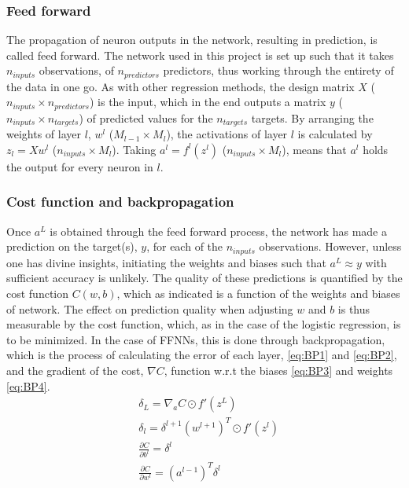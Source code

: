 \documentclass[%
oneside,                 %
final,                   %
10pt]{article}
\begin{document}
\subsubsection{Feed forward}
The propagation of neuron outputs in the network, resulting in prediction, is called feed forward. The network used in this project is set up such that it takes  $n_{inputs}$ observations, of $n_{predictors}$ predictors, thus working through the entirety of the data in one go. As with other regression methods, the design matrix $X$ ($n_{inputs} \times n_{predictors}$) is the input, which in the end outputs a matrix $ y$ ($n_{inputs} \times n_{targets}$) of predicted values for the $n_{targets}$ targets. By arranging the weights of layer $l$, $w^l$ ($M_{l-1} \times M_l$), the activations of layer $l$ is calculated by $z_l=X w^l$ ($n_{inputs} \times M_l$). Taking $a^l=f^l(z^l)$ ($n_{inputs} \times M_l$), means that $a^l$ holds the output for every neuron in $l$. 

\subsubsection{Cost function and backpropagation} \label{Section_M_NN}
Once $a^L$ is obtained through the feed forward process, the network has made a prediction on the target(s), $y$, for each of the $n_{inputs}$ observations. However, unless one has divine insights, initiating the weights and biases such that $a^L \approx y$ with sufficient accuracy is unlikely. The quality of these  predictions is quantified by the cost function $C(w,b)$, which as indicated is a function of the weights and biases of network. The effect on prediction quality when adjusting $w$ and $b$ is thus measurable by the cost function, which, as in the case of the logistic regression, is to be minimized. In the case of FFNNs, this is done through backpropagation, which is the process of calculating the error of each layer, \eqref{eq:BP1} and \eqref{eq:BP2}, and the gradient of the cost, $\nabla C$, function w.r.t the biases \eqref{eq:BP3} and weights \eqref{eq:BP4}. 
\begin{align}
\label{eq:BP1} &\delta_L=\nabla_a C \odot  f' (z^L) \\  
\label{eq:BP2} &\delta_l=\delta^{l+1}(w^{l+1})^T \odot  f' (z^l)\\ 
 \label{eq:BP3} &\frac{\partial C}{\partial b^l} =\delta^l\\ 
\label{eq:BP4} &\frac{\partial C}{\partial w^l} =(a^{l-1})^T \delta^l 
\end{align}
\end{document}
